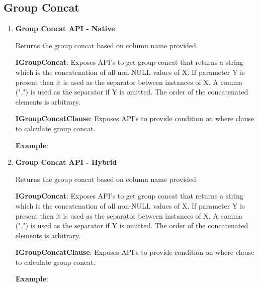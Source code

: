 	\subsection{Group Concat} 

		\begin{enumerate}
		
			\item \small \textbf{Group Concat API - Native}
				\par 
				Returns the group concat based on column name provided.
					
		
				\textbf{IGroupConcat}:     Exposes API's to get group concat that returns a string which is the concatenation of all non-NULL values of X.
							If parameter Y is present then it is used as the separator between instances of X. A comma (",") is used as the separator if Y is omitted.
							The order of the concatenated elements is arbitrary.


					

			
				\textbf{IGroupConcatClause}: Exposes API's to provide condition on where clause to calculate group concat.	
					

				\textbf{Example}: 
					

			\item \small \textbf{Group Concat API - Hybrid}
				\par 
				Returns the group concat based on column name provided.
					
		
				\textbf{IGroupConcat}:     Exposes API's to get group concat that returns a string which is the concatenation of all non-NULL values of X.
							If parameter Y is present then it is used as the separator between instances of X. A comma (",") is used as the separator if Y is omitted.
							The order of the concatenated elements is arbitrary.


					

			
				\textbf{IGroupConcatClause}: Exposes API's to provide condition on where clause to calculate group concat.	
					

				\textbf{Example}: 
					
	
		\end{enumerate}



